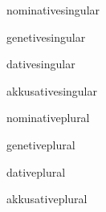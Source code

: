 

\glsaddkey
{nominativesingular}
{}
{\glsentrynominativesingular}
{\Glsentrynominativesingular}
{\glsnomsing}
{\Glsnomsing}
{\GLSnomsing}

\glsaddkey
{genetivesingular}
{}
{\glsentrygenetivesingular}
{\Glsentrygenetivesingular}
{\glsgensing}
{\Glsgensing}
{\GLSgensing}

\glsaddkey
{dativesingular}
{}
{\glsentrydativesingular}
{\Glsentrydativesingular}
{\glsdatsing}
{\Glsdatsing}
{\GLSdatsing}

\glsaddkey
{akkusativesingular}
{}
{\glsentryakkusativesingular}
{\Glsentryakkusativesingular}
{\glsakksing}
{\Glsakksing}
{\GLSakksing}

\glsaddkey
{nominativeplural}
{}
{\glsentrynominativeplural}
{\Glsentrynominativeplural}
{\glsnomplu}
{\Glsnomplu}
{\GLSnomplu}

\glsaddkey
{genetiveplural}
{}
{\glsentrygenetiveplural}
{\Glsentrygenetiveplural}
{\glsgenplu}
{\Glsgenplu}
{\GLSgenplu}

\glsaddkey
{dativeplural}
{}
{\glsentrydativeplural}
{\Glsentrydativeplural}
{\glsdatplu}
{\Glsdatplu}
{\GLSdatplu}

\glsaddkey
{akkusativeplural}
{}
{\glsentryakkusativeplural}
{\Glsentryakkusativeplural}
{\glsakkplu}
{\Glsakkplu}
{\GLSakkplu}

